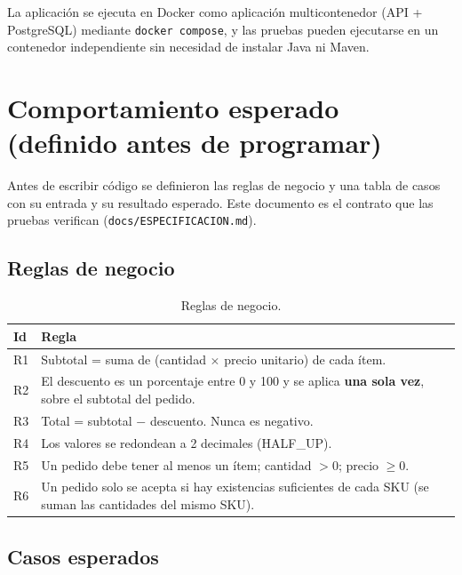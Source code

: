 \documentclass[11pt,a4paper]{article}
\begin{document}
La aplicación se ejecuta en Docker como aplicación multicontenedor (API + PostgreSQL) mediante
\texttt{docker compose}, y las pruebas pueden ejecutarse en un contenedor independiente sin necesidad
de instalar Java ni Maven.

\section{Comportamiento esperado (definido antes de programar)}
\label{sec:spec}

Antes de escribir código se definieron las reglas de negocio y una tabla de casos con su entrada y su
resultado esperado. Este documento es el contrato que las pruebas verifican
(\texttt{docs/ESPECIFICACION.md}).

\subsection{Reglas de negocio}

\begin{table}[H]
\centering
\begin{tabularx}{\textwidth}{@{}l L@{}}
\toprule
\textbf{Id} & \textbf{Regla}\\
\midrule
R1 & Subtotal = suma de (cantidad $\times$ precio unitario) de cada ítem.\\
R2 & El descuento es un porcentaje entre 0 y 100 y se aplica \textbf{una sola vez}, sobre el subtotal del pedido.\\
R3 & Total = subtotal $-$ descuento. Nunca es negativo.\\
R4 & Los valores se redondean a 2 decimales (HALF\_UP).\\
R5 & Un pedido debe tener al menos un ítem; cantidad $> 0$; precio $\geq 0$.\\
R6 & Un pedido solo se acepta si hay existencias suficientes de cada SKU (se suman las cantidades del mismo SKU).\\
\bottomrule
\end{tabularx}
\caption{Reglas de negocio.}
\end{table}

\subsection{Casos esperados}
\end{document}
